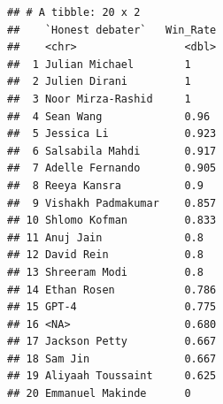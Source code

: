 \documentclass[
]{article}
\newenvironment{Shaded}{\begin{snugshade}}{\end{snugshade}}
\newcommand{\AttributeTok}[1]{\textcolor[rgb]{0.13,0.29,0.53}{#1}}
\newcommand{\CommentTok}[1]{\textcolor[rgb]{0.56,0.35,0.01}{\textit{#1}}}
\newcommand{\FloatTok}[1]{\textcolor[rgb]{0.00,0.00,0.81}{#1}}
\newcommand{\FunctionTok}[1]{\textcolor[rgb]{0.13,0.29,0.53}{\textbf{#1}}}
\newcommand{\NormalTok}[1]{#1}
\newcommand{\OtherTok}[1]{\textcolor[rgb]{0.56,0.35,0.01}{#1}}
\newcommand{\SpecialCharTok}[1]{\textcolor[rgb]{0.81,0.36,0.00}{\textbf{#1}}}
\newcommand{\StringTok}[1]{\textcolor[rgb]{0.31,0.60,0.02}{#1}}
\begin{document}
\begin{verbatim}
## # A tibble: 20 x 2
##    `Honest debater`   Win_Rate
##    <chr>                 <dbl>
##  1 Julian Michael        1    
##  2 Julien Dirani         1    
##  3 Noor Mirza-Rashid     1    
##  4 Sean Wang             0.96 
##  5 Jessica Li            0.923
##  6 Salsabila Mahdi       0.917
##  7 Adelle Fernando       0.905
##  8 Reeya Kansra          0.9  
##  9 Vishakh Padmakumar    0.857
## 10 Shlomo Kofman         0.833
## 11 Anuj Jain             0.8  
## 12 David Rein            0.8  
## 13 Shreeram Modi         0.8  
## 14 Ethan Rosen           0.786
## 15 GPT-4                 0.775
## 16 <NA>                  0.680
## 17 Jackson Petty         0.667
## 18 Sam Jin               0.667
## 19 Aliyaah Toussaint     0.625
## 20 Emmanuel Makinde      0
\end{verbatim}

\begin{Shaded}
\end{Shaded}
\end{document}
